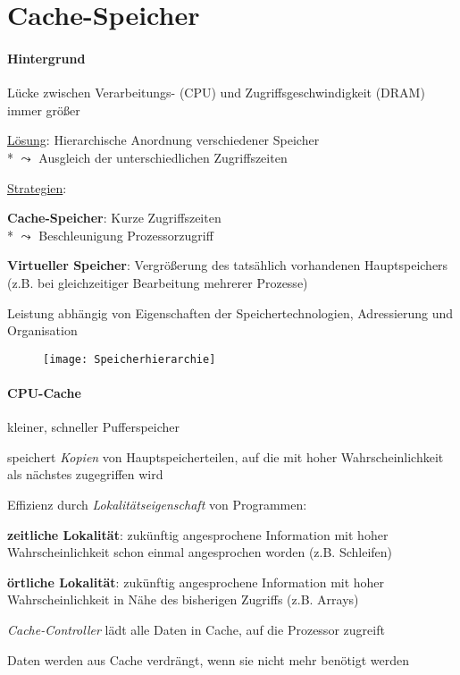 \section{Cache-Speicher}

\paragraph{Hintergrund}
\begin{items}
	\item Lücke zwischen Verarbeitungs- (CPU) und Zugriffsgeschwindigkeit (DRAM) immer größer
	\item \underline{Lösung}: Hierarchische Anordnung verschiedener Speicher \\*
		\( \leadsto \) Ausgleich der unterschiedlichen Zugriffszeiten
	\item \underline{Strategien}:
	\begin{enumeration}
		\item \textbf{Cache-Speicher}: Kurze Zugriffszeiten \\*
			\( \leadsto \) Beschleunigung Prozessorzugriff
		\item \textbf{Virtueller Speicher}: Vergrößerung des tatsählich vorhandenen Hauptspeichers (z.B. bei gleichzeitiger Bearbeitung mehrerer Prozesse)
	\end{enumeration}
	\item Leistung abhängig von Eigenschaften der Speichertechnologien, Adressierung und Organisation
\end{items}
\begin{figure}[H]\centering\label{Speicherhierarchie}\texttt{[image: Speicherhierarchie]}\end{figure}

\newpage

\paragraph{CPU-Cache}
\begin{items}
	\item kleiner, schneller Pufferspeicher
	\item speichert \emph{Kopien} von Hauptspeicherteilen, auf die mit hoher Wahrscheinlichkeit als nächstes zugegriffen wird
	\item Effizienz durch \emph{Lokalitätseigenschaft} von Programmen:
	\begin{enumeration}
		\item \textbf{zeitliche Lokalität}: zukünftig angesprochene Information mit hoher Wahrscheinlichkeit schon einmal angesprochen worden (z.B. Schleifen)
		\item \textbf{örtliche Lokalität}: zukünftig angesprochene Information mit hoher Wahrscheinlichkeit in Nähe des bisherigen Zugriffs (z.B. Arrays)
	\end{enumeration}
	\item \emph{Cache-Controller} lädt alle Daten in Cache, auf die Prozessor zugreift
	\item Daten werden aus Cache verdrängt, wenn sie nicht mehr benötigt werden
\end{items}

